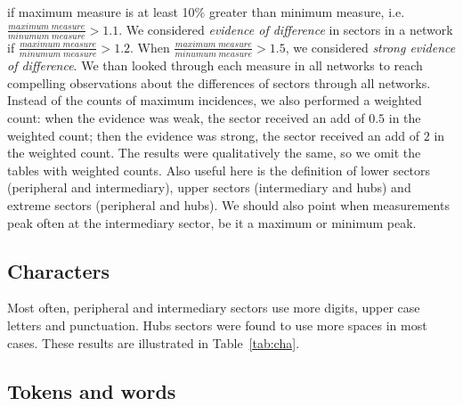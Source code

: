 if maximum measure is at least 10\% greater than minimum measure,
i.e. $\frac{maximum\;measure}{minumum\;measure}>1.1$.
We considered \emph{evidence of difference} in sectors in a network if
$\frac{maximum\;measure}{minumum\;measure}>1.2$.
When 
$\frac{maximum\;measure}{minumum\;measure}>1.5$, we considered \emph{strong evidence of difference}.
We than looked through each measure in all networks to reach compelling observations about the
differences of sectors through all networks.
Instead of the counts of maximum incidences, we also performed a weighted count:
when the evidence was weak, the sector received an add of $0.5$ in the weighted count;
then the evidence was strong, the sector received an add of $2$ in the weighted count.
The results were qualitatively the same, so we omit the tables with weighted counts.
Also useful here is the definition of lower sectors (peripheral and intermediary),
upper sectors (intermediary and hubs) and extreme sectors (peripheral and hubs).
We should also point when measurements peak often at the intermediary sector,
be it a maximum or minimum peak.


\subsection{Characters}\label{sec:cha}
Most often, peripheral and intermediary sectors use more digits, upper case letters and punctuation.
Hubs sectors were found to use more spaces in most cases. 
These results are illustrated in Table~\ref{tab:cha}.

\FloatBarrier

\subsection{Tokens and words}\label{subsec:tw}
%

